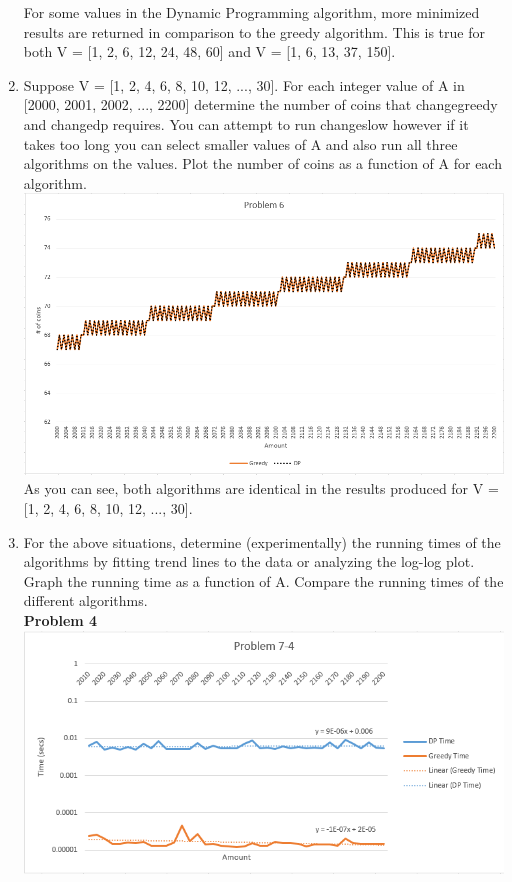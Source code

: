 \documentclass[11pt,letterpaper]{article}
\begin{document}
\begin{enumerate}
	For some values in the Dynamic Programming algorithm, more minimized results are returned in comparison to the greedy algorithm. This is true for both V = [1, 2, 6, 12, 24, 48, 60] and V = [1, 6, 13, 37, 150].
	\item Suppose V = [1, 2, 4, 6, 8, 10, 12, ..., 30]. For each integer value of A in [2000, 2001, 2002, ..., 2200] determine the number of coins that changegreedy and changedp requires. You can attempt to run changeslow however if it takes too long you can select smaller values of A and also run all three algorithms on the values. Plot the number of coins as a function of A for each algorithm.
	\includegraphics[width=5.5in]{p6.png}\\
	As you can see, both algorithms are identical in the results produced for V = [1, 2, 4, 6, 8, 10, 12, ..., 30].
	\item For the above situations, determine (experimentally) the running times of the algorithms by fitting trend lines to the data or analyzing the log-log plot. Graph the running time as a function of A. Compare the running times of the different algorithms.\\
	\textbf{Problem 4}\\
	\hskip-1.0cm\includegraphics[width=6.5in]{p7-4.png}\\

\end{enumerate}
\end{document}
